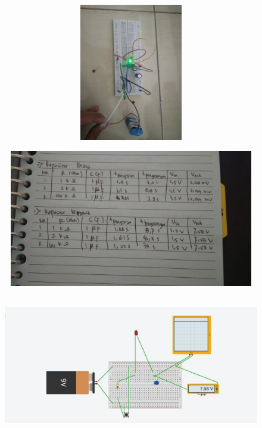 \documentclass[12pt,a4paper]{article}
\begin{document}
\begin{figure}
	\begin{center}
		\includegraphics[width=12cm, height=6cm]{g3.png}
			\end{center}
				\end{figure}
\begin{figure}
	\begin{center}
		\includegraphics[width=12cm, height=6cm]{g4.png}
			\end{center}
				\end{figure}
\newpage
\begin{figure}
	\begin{center}
		\includegraphics[width=12cm, height=6cm]{g5.png}
			\end{center}
				\end{figure}
\end{document}
